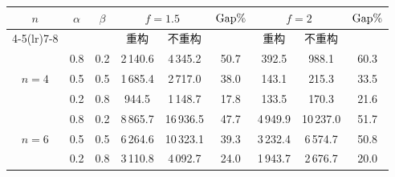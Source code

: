 \documentclass[authordraft]{ctacn}%
\begin{document}
\begin{center}
\label{tab:1}
\renewcommand\tabcolsep{10.6pt}%
\begin{tabular}
	{ccccccccc}\toprule
	\multirow{2}{*}[-2pt]{$n$}&\multirow{2}{*}[-2pt]{$\alpha$} &\multirow{2}{*}[-2pt]{$\beta$}&\multicolumn{2}{c}{$f=1.5$} &\multirow{2}{*}[-2pt]{${\rm{Gap}}\%$}&\multicolumn{2}{c}{\multirow{1}{*}{$f=2$}} &\multirow{2}{*}[-2pt]{${\rm{Gap}}\%$}\\
	\cmidrule(lr){4-5}\cmidrule(lr){7-8}
	&&&重构&不重构&&重构&不重构\\\midrule
	&0.8&0.2&2\,140.6&4\,345.2&50.7&392.5&988.1&60.3\\
	$n=4$&0.5&0.5&1\,685.4&2\,717.0&38.0&143.1&215.3&33.5\\
	&0.2&0.8&944.5&1\,148.7&17.8&133.5&170.3&21.6\\\midrule
	&0.8&0.2&8\,865.7&16\,936.5&47.7&4\,949.9&10\,237.0&51.7 \\
	$n=6$&0.5&0.5&6\,264.6&10\,323.1&39.3&3\,232.4&6\,574.7&50.8\\
	&0.2&0.8&3\,110.8&4\,092.7&24.0&1\,943.7&2\,676.7&20.0\\
	\bottomrule
\end{tabular}\end{center}
\end{document}
